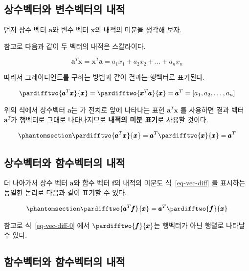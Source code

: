 \documentclass[
  11pt,
  a4paper,
  oneside]{scrbook}
\theoremstyle{definition}
\theoremstyle{definition}
\theoremstyle{plain}
\theoremstyle{remark}
\begin{document}
\subsection{상수벡터와 변수벡터의
내적}\label{uxc0c1uxc218uxbca1uxd130uxc640-uxbcc0uxc218uxbca1uxd130uxc758-uxb0b4uxc801}

먼저 상수 벡터 \(\pmb a\)와 변수 벡터 \(\pmb x\)의 내적의 미분을 생각해
보자.

참고로 다음과 같이 두 벡터의 내적은 스칼라이다.

\[ \pmb a^T \pmb x = \pmb x^T \pmb a = a_1 x_1 + a_2x_2 + \dots + a_n x_n \]

따라서 그레이디언트를 구하는 방법과 같이 결과는 행백터로 표기된다.

\[
\pardifftwo{ \pmb a^T \pmb x}{\pmb x} = \pardifftwo{ \pmb x^T \pmb a}{\pmb x} = \pmb a^T =[a_1, a_2, \dots, a_n]
\]

위의 식에서 상수벡터 \(\pmb a\)는 가 전치로 앞에 나타나는 표현
\(\pmb a^T \pmb x\) 를 사용하면 결과 벡터 \(\pmb a^T\)가 행벡터로 그대로
나타나지므로 \textbf{내적의 미분 표기}로 사용할 것이다.

\begin{equation}\phantomsection\label{eq-vec-diff}{ 
\pardifftwo{ \pmb a^T \pmb x}{\pmb x} = \pmb a^T \pardifftwo{  \pmb x}{\pmb x} =\pmb a^T 
}\end{equation}

\subsection{상수벡터와 함수벡터의
내적}\label{uxc0c1uxc218uxbca1uxd130uxc640-uxd568uxc218uxbca1uxd130uxc758-uxb0b4uxc801}

더 나아가서 상수 벡터 \(\pmb a\)와 함수 벡터 \(\pmb f\)의 내적의 미분도
식~\ref{eq-vec-diff} 을 표시하는 동일한 논리로 다음과 같이 표기할 수
있다.

\begin{equation}\phantomsection\label{eq-vec-diff-0}{ 
\pardifftwo{ \pmb a^T \pmb f}{\pmb x} = \pmb a^T \pardifftwo{  \pmb f}{\pmb x}
}\end{equation}

참고로 식~\ref{eq-vec-diff-0} 에서 \(\pardifftwo{ \pmb f}{\pmb x}\)는
행벡터가 아닌 행렬로 나타날 수 있다.

\subsection{함수벡터와 함수벡터의
내적}\label{uxd568uxc218uxbca1uxd130uxc640-uxd568uxc218uxbca1uxd130uxc758-uxb0b4uxc801}
\end{document}
